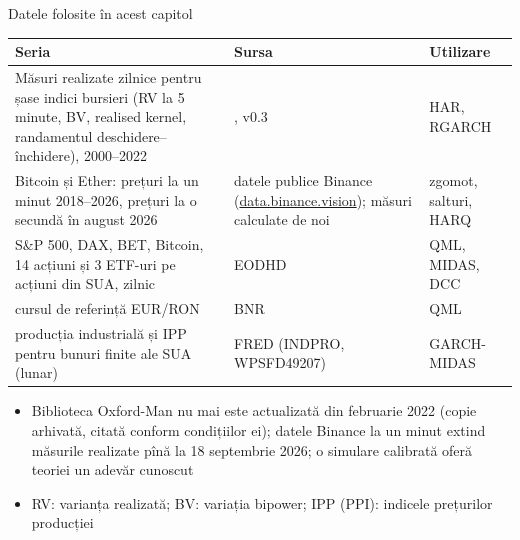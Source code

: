 \begin{frame}{Datele folosite în acest capitol}
\itemsize{\footnotesize}
\begin{center}
\scriptsize
\begin{tabular}{>{\raggedright\arraybackslash}p{4.6cm}>{\raggedright\arraybackslash}p{4.9cm}>{\raggedright\arraybackslash}p{2.4cm}}
\toprule
\textbf{Seria} & \textbf{Sursa} & \textbf{Utilizare} \\
\midrule
Măsuri realizate zilnice pentru șase indici bursieri (RV la 5 minute, BV, realised kernel, randamentul deschidere--închidere), 2000--2022 & , v0.3 & HAR, RGARCH \\
Bitcoin și Ether: prețuri la un minut 2018--2026, prețuri la o secundă în august 2026 & datele publice Binance (\href{https://data.binance.vision}{data.binance.vision}); măsuri calculate de noi & zgomot, salturi, HARQ \\
S\&P 500, DAX, BET, Bitcoin, 14 acțiuni și 3 ETF-uri pe acțiuni din SUA, zilnic & EODHD & QML, MIDAS, DCC \\
cursul de referință EUR/RON & BNR & QML \\
producția industrială și IPP pentru bunuri finite ale SUA (lunar) & FRED (INDPRO, WPSFD49207) & GARCH-MIDAS \\
\bottomrule
\end{tabular}
\end{center}
\begin{itemize}
    \item Biblioteca Oxford-Man nu mai este actualizată din februarie 2022 (copie arhivată, citată conform condițiilor ei); datele Binance la un minut extind măsurile realizate pînă la 18 septembrie 2026; o simulare calibrată oferă teoriei un adevăr cunoscut
    \item RV: varianța realizată; BV: variația bipower; IPP (PPI): indicele prețurilor producției
\end{itemize}
\end{frame}

